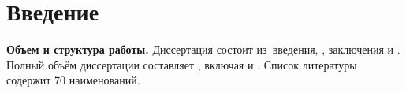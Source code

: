 \chapter*{Введение}                         %

\newcommand{\actuality}{\textbf{\actualityTXT}}
\newcommand{\progress}{\textbf{\progressTXT}}
\newcommand{\aim}{{\textbf\aimTXT}}
\newcommand{\tasks}{\textbf{\tasksTXT}}
\newcommand{\novelty}{\textbf{\noveltyTXT}}
\newcommand{\influence}{\textbf{\influenceTXT}}
\newcommand{\methods}{\textbf{\methodsTXT}}
\newcommand{\defpositions}{\textbf{\defpositionsTXT}}
\newcommand{\reliability}{\textbf{\reliabilityTXT}}
\newcommand{\probation}{\textbf{\probationTXT}}
\newcommand{\object}{\textbf{\objectTXT}}
\newcommand{\theoreticalSignificance}{\textbf{\theoreticalSignificanceTXT}}
\newcommand{\pasport}{\textbf{\pasportTXT}}
\newcommand{\subject}{\textbf{\subjectTXT}}
\newcommand{\contribution}{\textbf{\contributionTXT}}
\newcommand{\publications}{\textbf{\publicationsTXT}}


\textbf{Объем и структура работы.} Диссертация состоит из~введения,
,
заключения и
.
%
Полный объём диссертации составляет
, включая
 и
.
Список литературы содержит 70 наименований.
